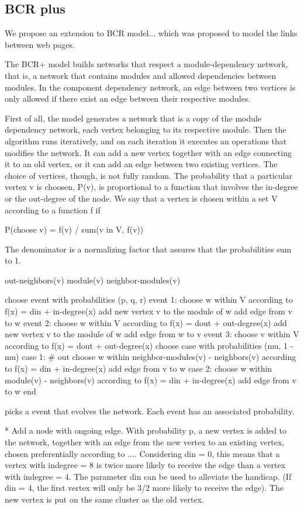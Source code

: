 \subsection{BCR plus}

We propose an extension to BCR model... which was proposed to model the links
between web pages.

The BCR+ model builds networks that respect a module-dependency network, that
is, a network that contains modules and allowed dependencies between modules. 
In the component dependency network, an edge between two vertices is only
allowed if there exist an edge between their respective modules.

First of all, the model generates a network that is a copy of the module
dependency network, each vertex belonging to its respective module. Then the
algorithm runs iteratively, and on each iteration it executes an operations that
modifies the network. It can add a new vertex together with an edge connecting it
to an old vertex, or it can add an edge between two existing vertices. The
choice of vertices, though, is not fully random. The probability that a
particular vertex v is choosen, P(v), is proportional to a function that involves the
in-degree or the out-degree of the node. We say that a vertex is chosen within a
set V according to a function f if

P(choose v) = f(v) / sum(v in V, f(v))

The denominator is a normalizing factor that assures that the probabilities sum
to 1.

out-neighbors(v) 
module(v)
neighbor-modules(v)

choose event with probabilities (p, q, r)
event 1:
  choose w within V according to f(x) = din + in-degree(x)
  add new vertex v to the module of w
  add edge from v to w
event 2:
  choose w within V according to f(x) = dout + out-degree(x)
  add new vertex v to the module of w
  add edge from w to v
event 3:
  choose v within V according to f(x) = dout + out-degree(x)
  choose case with probabilities (mu, 1 - mu)
  case 1: # out
    choose w within neighbor-modules(v) - neighbors(v) according to f(x) = din + in-degree(x)
    add edge from v to w
  case 2:
    choose w within module(v) - neighbors(v) according to f(x) = din + in-degree(x)
    add edge from v to w
end

picks a event that evolves
the network. Each event has an associated probability.

* Add a node with ongoing edge. With probability p, a new vertex is added to the network, together with an
edge from the new vertex to an existing vertex, chosen preferentially according
to .... Considering din = 0, this means that a vertex with indegree = 8 is
twice more likely to receive the edge than a vertex with indegree = 4. The
parameter din can be used to alleviate the handicap. (If din = 4, the first
vertex will only be 3/2 more likely to receive the edge). The new vertex is
put on the same cluster as the old vertex.

